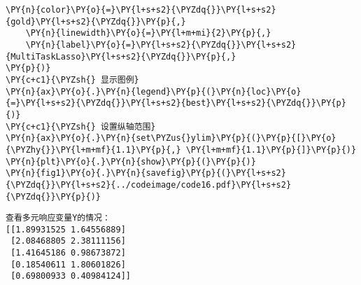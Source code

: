 \begin{Verbatim}[commandchars=\\\{\}]
    \PY{n}{color}\PY{o}{=}\PY{l+s+s2}{\PYZdq{}}\PY{l+s+s2}{gold}\PY{l+s+s2}{\PYZdq{}}\PY{p}{,}
    \PY{n}{linewidth}\PY{o}{=}\PY{l+m+mi}{2}\PY{p}{,}
    \PY{n}{label}\PY{o}{=}\PY{l+s+s2}{\PYZdq{}}\PY{l+s+s2}{MultiTaskLasso}\PY{l+s+s2}{\PYZdq{}}\PY{p}{,}
\PY{p}{)}
\PY{c+c1}{\PYZsh{} 显示图例}
\PY{n}{ax}\PY{o}{.}\PY{n}{legend}\PY{p}{(}\PY{n}{loc}\PY{o}{=}\PY{l+s+s2}{\PYZdq{}}\PY{l+s+s2}{best}\PY{l+s+s2}{\PYZdq{}}\PY{p}{)}
\PY{c+c1}{\PYZsh{} 设置纵轴范围}
\PY{n}{ax}\PY{o}{.}\PY{n}{set\PYZus{}ylim}\PY{p}{(}\PY{p}{[}\PY{o}{\PYZhy{}}\PY{l+m+mf}{1.1}\PY{p}{,} \PY{l+m+mf}{1.1}\PY{p}{]}\PY{p}{)}
\PY{n}{plt}\PY{o}{.}\PY{n}{show}\PY{p}{(}\PY{p}{)}
\PY{n}{fig1}\PY{o}{.}\PY{n}{savefig}\PY{p}{(}\PY{l+s+s2}{\PYZdq{}}\PY{l+s+s2}{../codeimage/code16.pdf}\PY{l+s+s2}{\PYZdq{}}\PY{p}{)}
\end{Verbatim}

\begin{Verbatim}[commandchars=\\\{\}]
查看多元响应变量Y的情况：
[[1.89931525 1.64556889]
 [2.08468805 2.38111156]
 [1.41645186 0.98673872]
 [0.18540611 1.80601826]
 [0.69800933 0.40984124]]
\end{Verbatim}
